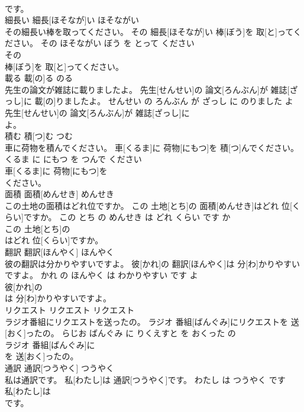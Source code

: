 \documentclass[8pt]{extreport}
\begin{document}
\begin{CJK}{UTF8}{min}
\\	です。			
\\	細長い	細長[ほそなが]い	ほそながい	
\\	その細長い棒を取ってください。	その 細長[ほそなが]い 棒[ぼう]を 取[と]ってください。	その ほそながい ぼう を とって ください	
\\	その
\\	棒[ぼう]を 取[と]ってください。			
\\	載る	載[の]る	のる	
\\	先生の論文が雑誌に載りましたよ。	先生[せんせい]の 論文[ろんぶん]が 雑誌[ざっし]に 載[の]りましたよ。	せんせい の ろんぶん が ざっし に のりました よ	
\\	先生[せんせい]の 論文[ろんぶん]が 雑誌[ざっし]に
\\	よ。			
\\	積む	積[つ]む	つむ	
\\	車に荷物を積んでください。	車[くるま]に 荷物[にもつ]を 積[つ]んでください。	くるま に にもつ を つんで ください	
\\	車[くるま]に 荷物[にもつ]を
\\	ください。			
\\	面積	面積[めんせき]	めんせき	
\\	この土地の面積はどれ位ですか。	この 土地[とち]の 面積[めんせき]はどれ 位[くらい]ですか。	この とち の めんせき は どれ くらい です か	
\\	この 土地[とち]の
\\	はどれ 位[くらい]ですか。			
\\	翻訳	翻訳[ほんやく]	ほんやく	
\\	彼の翻訳は分かりやすいですよ。	彼[かれ]の 翻訳[ほんやく]は 分[わ]かりやすいですよ。	かれ の ほんやく は わかりやすい です よ	
\\	彼[かれ]の
\\	は 分[わ]かりやすいですよ。			
\\	リクエスト	リクエスト	リクエスト	
\\	ラジオ番組にリクエストを送ったの。	ラジオ 番組[ばんぐみ]にリクエストを 送[おく]ったの。	らじお ばんぐみ に りくえすと を おくった の	
\\	ラジオ 番組[ばんぐみ]に
\\	を 送[おく]ったの。			
\\	通訳	通訳[つうやく]	つうやく	
\\	私は通訳です。	私[わたし]は 通訳[つうやく]です。	わたし は つうやく です	
\\	私[わたし]は
\\	です。			

\end{CJK}
\end{document}
